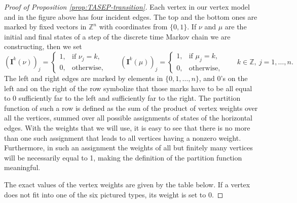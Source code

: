 \documentclass[11pt,reqno]{amsart}
\theoremstyle{definition}
\theoremstyle{remark}
\theoremstyle{remark}
\def\I{\bm{I}}
\def\Z{\mathbb Z}
\numberwithin{equation}{section}
\begin{document}
\begin{proof}[Proof of Proposition \ref{prop:TASEP-transition}]
		Each vertex in our vertex model and in the figure above has four incident edges. The top and the bottom ones are marked by fixed vectors in $\Z^n$ with coordinates from $\{0,1\}$. If $\nu$ and $\mu$ are the initial and final states of a step  of the discrete time Markov chain we are constructing, then we set
		$$
		(\I^k(\nu))_j=\begin{cases} 1,& \text{if  } \nu_j=k,\\ 0,& \text{otherwise}, 
		\end{cases}
		\qquad
		(\I^k(\mu))_j=\begin{cases} 1,& \text{if  } \mu_j=k,\\ 0,& \text{otherwise}, 
		\end{cases}
		\qquad k\in\Z,\ j=1,\dots,n. 
		$$ 
		The left and right edges are marked by elements in $\{0,1,\dots,n\}$, and 0's on the left and on the right of the row symbolize that those marks have to be all equal to 0 sufficiently far to the left and sufficiently far to the right. The partition function of such a row is defined as the sum of the product of vertex weights over all the vertices, summed over all possible assignments of states of the horizontal edges. With the weights that we will use, it is easy to see that there is no more than one such assignment that leads to all vertices having a nonzero weight. Furthermore, in such an assignment the weights of all but finitely many vertices will be necessarily equal to 1, making the definition of the partition function meaningful. 
		
		The exact values of the vertex weights are given by the table below. If a vertex does not fit into one of the six pictured types, its weight is set to 0. 
		

\end{proof}
\end{document}
